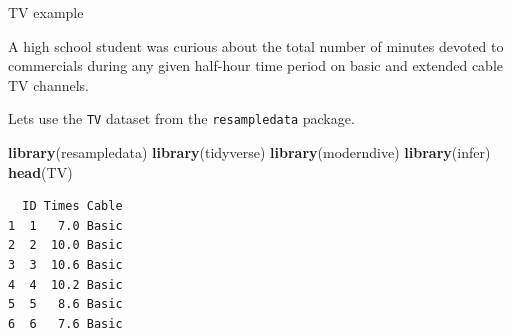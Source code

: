 \documentclass[
  ignorenonframetext,
]{beamer}
\newenvironment{Shaded}{\begin{snugshade}}{\end{snugshade}}
\newcommand{\FunctionTok}[1]{\textcolor[rgb]{0.13,0.29,0.53}{\textbf{#1}}}
\newcommand{\NormalTok}[1]{#1}
\begin{document}
\begin{frame}[fragile]{TV example}
\protect\hypertarget{tv-example}{}
\begin{tcolorbox}
A high school student was curious about the total number of minutes devoted to commercials during any given half-hour time period on basic and extended cable TV channels.
\end{tcolorbox}

Lets use the \texttt{TV} dataset from the \texttt{resampledata} package.
\small

\begin{Shaded}
\begin{Highlighting}[]
\FunctionTok{library}\NormalTok{(resampledata)}
\FunctionTok{library}\NormalTok{(tidyverse)}
\FunctionTok{library}\NormalTok{(moderndive)}
\FunctionTok{library}\NormalTok{(infer)}
\FunctionTok{head}\NormalTok{(TV)}
\end{Highlighting}
\end{Shaded}

\begin{verbatim}
  ID Times Cable
1  1   7.0 Basic
2  2  10.0 Basic
3  3  10.6 Basic
4  4  10.2 Basic
5  5   8.6 Basic
6  6   7.6 Basic
\end{verbatim}

\normalsize
\end{frame}
\end{document}
